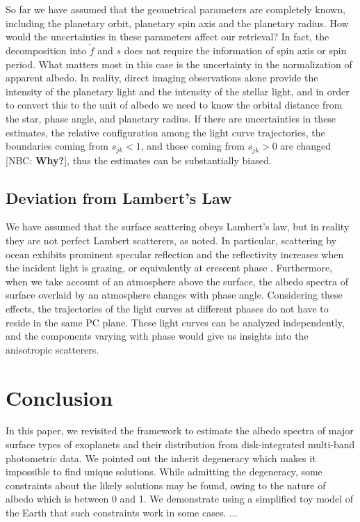 \documentclass[iop,numberedappendix,apj,]{emulateapj}
\def\fast{\tilde f}
\def\memoNBC#1{\color{blue}[NBC: {\bf #1}]\color{black}}
\begin{document}
So far we have assumed that the geometrical parameters are completely known, including the planetary orbit, planetary spin axis and the planetary radius. 
How would the uncertainties in these parameters affect our retrieval?
In fact, the decomposition into $\fast $ and $s$ does not require the information of spin axis or spin period. 
What matters most in this case is the uncertainty in the normalization of apparent albedo. 
In reality, direct imaging observations alone provide the intensity of the 
planetary light and the intensity of the stellar light, and in order to convert this to the unit of albedo we need to know the orbital distance from the star, phase angle, and planetary radius. 
If there are uncertainties in these estimates, the relative configuration among the light curve trajectories, the boundaries coming from $s_{jk} < 1$, and those coming from $s_{jk} > 0$ are changed \memoNBC{Why?}, thus the estimates can be substantially biased. 

\subsection{Deviation from Lambert's Law}
\label{ss:deviateLambert}

We have assumed that the surface scattering obeys Lambert's law, but in reality they are not perfect Lambert scatterers, as noted. 
In particular, scattering by ocean exhibits prominent specular reflection and the reflectivity increases when the incident light is grazing, or equivalently at crescent phase \citep[e.g.,][]{Williams2008}. 
Furthermore, when we take account of an atmosphere above the surface, the albedo spectra of surface overlaid by an atmosphere changes with phase angle.  
Considering these effects, the trajectories of the light curves at different phases do not have to reside in the same PC plane. 
These light curves can be analyzed independently, and the components varying with phase would give us insights into the anisotropic scatterers. 


\section{Conclusion}
\label{s:conclusion}

In this paper, we revisited the framework to estimate the albedo spectra of major surface types of exoplanets and their distribution from disk-integrated multi-band photometric data. 
We pointed out the inherit degeneracy which makes it impossible to find unique solutions. 
While admitting the degeneracy, some constraints about the likely solutions may be found, owing to the nature of albedo which is between 0 and 1. 
We demonstrate using a simplified toy model of the Earth that such constraints work in some cases. 
...
\end{document}
